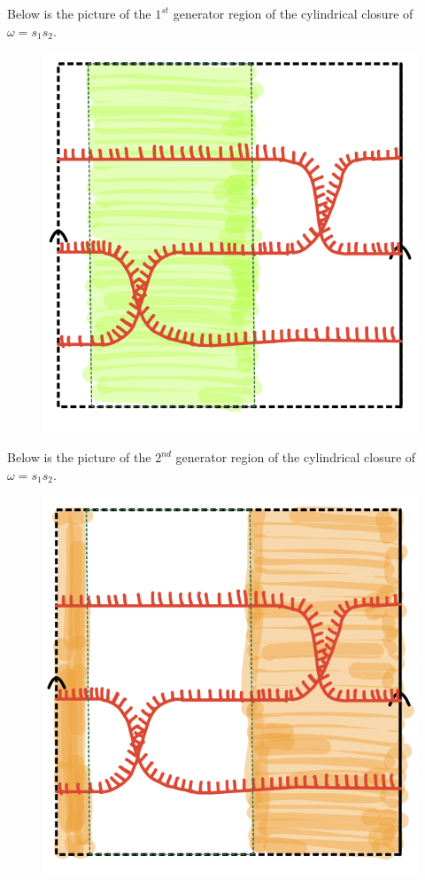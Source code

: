 Below is the picture of the $1^{st}$ generator region of the cylindrical closure of $\omega = s_1 s_2$.

\begin{figure}[H] 
    \centering
    \includegraphics[scale = 0.95]{diagrams/natural_alternating_diagrams/6-1.png}
    \caption{}
    \label{fig:your-label}
\end{figure}

Below is the picture of the $2^{nd}$ generator region of the cylindrical closure of $\omega = s_1 s_2$.

\begin{figure}[H] 
    \centering
    \includegraphics[scale = 0.95]{diagrams/natural_alternating_diagrams/6-2.png}
    \caption{}
    \label{fig:your-label}
\end{figure}

